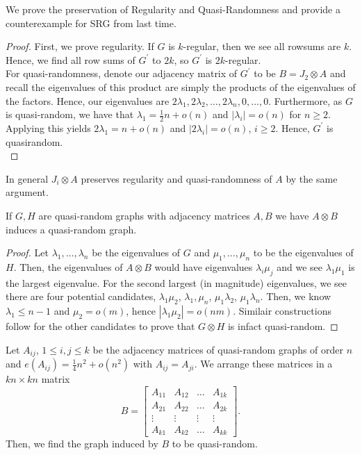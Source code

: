 We prove the preservation of Regularity and Quasi-Randomness and provide a counterexample for  SRG from last time.
\begin{proof}
	First, we prove regularity. If \(G\) is \(k\)-regular, then we see all rowsums are \(k\). Hence, we find all row sums of \(G^{\prime}\) to \(2k\), so \(G^{\prime}\) is \(2k\)-regular.\\
	For quasi-randomness, denote our adjacency matrix of \(G^{\prime}\) to be \(B = J_2 \otimes A\) and recall the eigenvalues of this product are simply the products of the eigenvalues of the factors. Hence, our eigenvalues are \(2\lambda_1, 2\lambda_2, \ldots, 2\lambda_{n}, 0, \ldots, 0\). Furthermore, as \(G\) is quasi-random, we have that \(\lambda_1 = \frac{1}{2}n + o\left( n \right) \) and \(\left| \lambda_{i} \right|  = o\left( n \right) \) for \(n \ge 2\). Applying this yields \(2\lambda_1 = n + o\left( n \right) \) and \(\left| 2\lambda_{i} \right|  = o\left( n \right) \), \(i \ge 2\). Hence, \(G^{\prime}\)  is quasirandom.\\
\end{proof}
\begin{remark}
	In general \(J_i \otimes A\) preserves regularity and quasi-randomness of \(A\)  by the same argument.
\end{remark}
\begin{proposition}
	If \(G, H\) are quasi-random graphs with adjacency matrices \(A, B\) we have \(A \otimes B\) induces a quasi-random graph.
\end{proposition}
\begin{proof}
	Let \(\lambda_1, \ldots, \lambda_{n}\)  be the eigenvalues of \(G\) and \( \mu_1, \ldots, \mu_{n}\) to be the eigenvalues of \(H\). Then, the eigenvalues of \(A \otimes B\)  would have eigenvalues \(\lambda_{i}\mu_{j}\) and we see \(\lambda_1 \mu_1\) is the largest eigenvalue. For the second largest (in magnitude) eigenvalues, we see there are four potential candidates, \(\lambda_1 \mu_2\), \(\lambda_1 , \mu_{n}\), \(\mu_1 \lambda_2\), \(\mu_1 \lambda_n\). Then, we know \(\lambda_1 \le n-1\) and \(\mu_2 = o\left( m \right) \), hence \(\left| \lambda_1 \mu_2 \right| = o\left( nm \right) \). Similair constructions follow for the other candidates to prove that \(G \otimes H\)  is infact quasi-random.
\end{proof}
\begin{proposition}
	Let \(A_{ij}\), \(1 \le i, j \le k\)   be the adjacency matrices of quasi-random graphs of order \(n\) and \(e\left( A_{ij} \right) = \frac{1}{4}n^2 + o\left( n^2 \right)  \) with \(A_{ij} = A_{ji}\). We arrange these matrices in a \(kn \times kn\) matrix	\[
		B = \begin{bmatrix} A_{11} & A_{12} & \ldots & A_{1k}\\
		A_{21}  & A_{22} & \ldots & A_{2k}\\
	\vdots & \vdots & \vdots & \vdots \\
A_{k1} & A_{k2} & \ldots & A_{k k}\end{bmatrix}
	.\]
	Then, we find the graph induced by \(B\) to be quasi-random.
\end{proposition}
